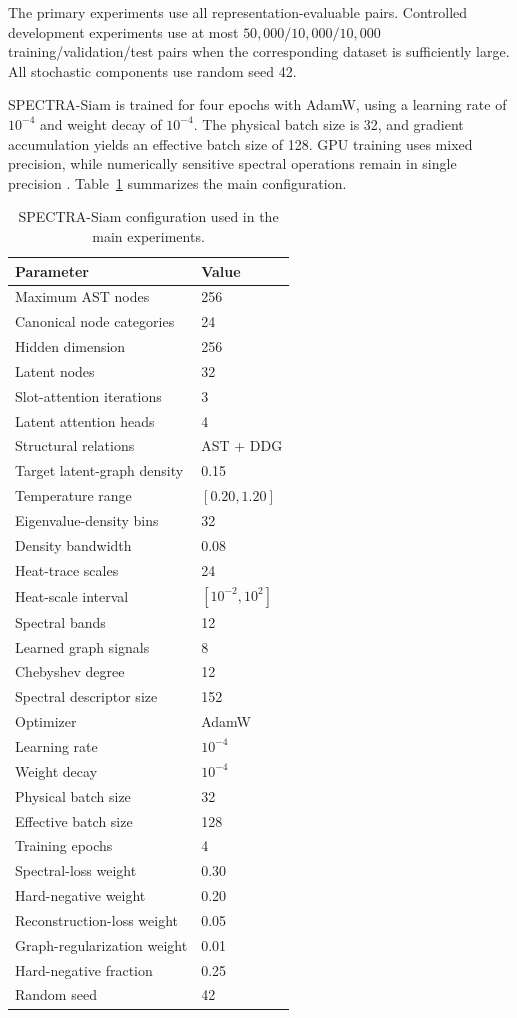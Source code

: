 \documentclass[authoryear,final,5p,times,twocolumn]{elsarticle}
\theoremstyle{plain}
\begin{document}
The primary experiments use all representation-evaluable pairs. Controlled
development experiments use at most
$50{,}000/10{,}000/10{,}000$
training/validation/test pairs when the corresponding dataset is sufficiently
large. All stochastic components use random seed 42.

SPECTRA-Siam is trained for four epochs with AdamW, using a learning rate of
$10^{-4}$ and weight decay of $10^{-4}$. The physical batch size is 32, and
gradient accumulation yields an effective batch size of 128. GPU training
uses mixed precision, while numerically sensitive spectral operations remain
in single precision \cite{??}. Table~\ref{tab:experimental_settings}
summarizes the main configuration.

\begin{table}[t]
\centering
\caption{SPECTRA-Siam configuration used in the main experiments.}
\label{tab:experimental_settings}
\footnotesize
\renewcommand{\arraystretch}{1.12}
\begin{tabular}{ll}
\toprule
\textbf{Parameter} & \textbf{Value} \\
\midrule
Maximum AST nodes & 256 \\
Canonical node categories & 24 \\
Hidden dimension & 256 \\
Latent nodes & 32 \\
Slot-attention iterations & 3 \\
Latent attention heads & 4 \\
Structural relations & AST + DDG \\
Target latent-graph density & 0.15 \\
Temperature range & $[0.20,1.20]$ \\
\midrule
Eigenvalue-density bins & 32 \\
Density bandwidth & 0.08 \\
Heat-trace scales & 24 \\
Heat-scale interval & $[10^{-2},10^{2}]$ \\
Spectral bands & 12 \\
Learned graph signals & 8 \\
Chebyshev degree & 12 \\
Spectral descriptor size & 152 \\
\midrule
Optimizer & AdamW \\
Learning rate & $10^{-4}$ \\
Weight decay & $10^{-4}$ \\
Physical batch size & 32 \\
Effective batch size & 128 \\
Training epochs & 4 \\
Spectral-loss weight & 0.30 \\
Hard-negative weight & 0.20 \\
Reconstruction-loss weight & 0.05 \\
Graph-regularization weight & 0.01 \\
Hard-negative fraction & 0.25 \\
Random seed & 42 \\
\bottomrule
\end{tabular}
\end{table}
\end{document}
